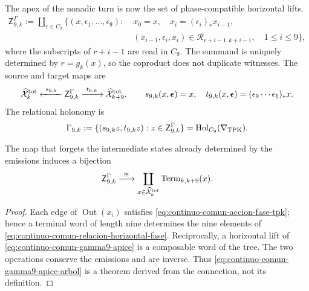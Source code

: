 The apex of the nonadic turn is now the set of phase-compatible horizontal lifts.
\begin{equation}
\label{eq:continuo-comun-gamma9-apice}
 \begin{split}
 \mathsf Z^{\Gamma}_{9,k}:=\coprod_{r\in C_9}\bigl\{
 (x,\epsilon_1,\ldots,\epsilon_9):\;&x_0=x,\quad
 x_i=(\epsilon_i)_*x_{i-1},\\
 &(x_{i-1},\epsilon_i,x_i)
 \in\mathscr R_{r+i-1,k+i-1},\quad 1\leq i\leq9
 \bigr\},
 \end{split}
\end{equation}
 where the subscripts of \(r+i-1\) are read in \(C_9\). The summand is
uniquely determined by \(r=g_k(x)\), so the coproduct does not
duplicate witnesses. The source and
target maps are
\begin{equation}
\label{eq:continuo-comun-gamma9-span}
 \widehat{\mathcal X}^{\rm tot}_k
 \xleftarrow{\ s_{9,k}\ }
 \mathsf Z^{\Gamma}_{9,k}
 \xrightarrow{\ t_{9,k}\ }
 \widehat{\mathcal X}^{\rm tot}_{k+9},
 \qquad
 s_{9,k}(x,\boldsymbol\epsilon)=x,\quad
 t_{9,k}(x,\boldsymbol\epsilon)
 =(\epsilon_9\cdots\epsilon_1)_*x.
\end{equation}
The relational holonomy is
\begin{equation}
\label{eq:continuo-comun-gamma9-relacion}
 \Gamma_{9,k}:=
 \{(s_{9,k}z,t_{9,k}z):z\in\mathsf Z^{\Gamma}_{9,k}\}
 =\operatorname{Hol}_{C_9}(\nabla_{\rm TPK}).
\end{equation}

\begin{lemma}
\label{lem:continuo-comun-gamma9-arbol}
The map that forgets the intermediate states already determined by the emissions induces a bijection
\begin{equation}
\label{eq:continuo-comun-gamma9-apice-arbol}
 \mathsf Z^{\Gamma}_{9,k}
 \xrightarrow{\ \cong\ }
 \coprod_{x\in\widehat{\mathcal X}^{\rm tot}_k}
 \operatorname{Term}_{k,k+9}(x).
\end{equation}
\end{lemma}

\begin{proof}
Each edge of \(\operatorname{Out}(x_i)\) satisfies
\eqref{eq:continuo-comun-accion-fase-tpk}; hence a terminal word of
length nine determines the nine elements of
\eqref{eq:continuo-comun-relacion-horizontal-fase}. Reciprocally, a horizontal lift
of \eqref{eq:continuo-comun-gamma9-apice} is a composable word
of the tree. The two operations conserve the emissions and are
inverse. Thus \eqref{eq:continuo-comun-gamma9-apice-arbol} is a theorem
derived from the connection, not its definition.
\end{proof}

